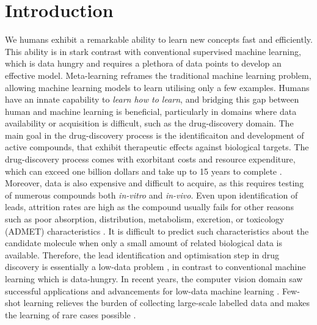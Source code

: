 \section{Introduction}

We humans exhibit a remarkable ability to learn new concepts fast and efficiently. This ability is in stark contrast with conventional supervised machine learning, which is data hungry and requires a plethora of data points to develop an effective model. Meta-learning reframes the traditional machine learning problem, allowing machine learning models to learn utilising only a few examples. Humans have an innate capability to \textit{learn how to learn}, and bridging this gap between human and machine learning is beneficial, particularly in domains where data availability or acquisition is difficult, such as the drug-discovery domain. The main goal in the drug-discovery process is the identificaiton and development of active compounds, that exhibit therapeutic effects against biological targets. The drug-discovery process comes with exorbitant costs and resource expenditure, which can exceed one billion dollars and take up to 15 years to complete \cite{hughes2011principles}. Moreover, data is also expensive and difficult to acquire, as this requires testing of numerous compounds both \textit{in-vitro} and \textit{in-vivo}. Even upon identification of leads, attrition rates are high as the compound usually fails for other reasons such as poor absorption, distribution, metabolism, excretion, or toxicology (ADMET) characteristics \cite{waring2015analysis}. It is difficult to predict such characteristics about the candidate molecule when only a small amount of related biological data is available. Therefore, the lead identification and optimisation step in drug discovery is essentially a low-data problem \cite{altae2017low}, in contrast to conventional machine learning which is data-hungry. In recent years, the computer vision domain saw successful applications and advancements for low-data machine learning \cite{koch2015siamese, vinyals2016matching, snell2017prototypical, sung2018learning}. Few-shot learning relieves the burden of collecting large-scale labelled data and makes the learning of rare cases possible \cite{wang2020generalizing}. 


